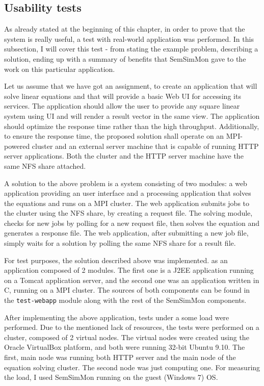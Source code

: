 \subsection{Usability tests}

As already stated at the beginning of this chapter, in order to prove that the system is really useful, a test with real-world application was performed. In this subsection, I will cover this test - from stating the example problem, describing a solution, ending up with a summary of benefits that SemSimMon gave to the work on this particular application.

Let us assume that we have got an assignment, to create an application that will solve linear equations and that will provide a basic Web UI for accessing its services. The application should allow the user to provide any square linear system using UI and will render a result vector in the same view. The application should optimize the response time rather than the high throughput. Additionally, to ensure the response time, the proposed solution shall operate on an MPI-powered cluster and an external server machine that is capable of running HTTP server applications. Both the cluster and the HTTP server machine have the same NFS share attached. 

A solution to the above problem is a system consisting of two modules: a web application providing an user interface and a processing application that solves the equations and runs on a MPI cluster. The web application submits jobs to the cluster using the NFS share, by creating a request file. The solving module, checks for new jobs by polling for a new request file, then solves the equation and generates a response file. The web application, after submitting a new job file, simply waits for a solution by polling the same NFS share for a result file. 

For test purposes, the solution described above was implemented. as an application composed of 2 modules. The first one is a J2EE application running on a Tomcat application server, and the second one was an application written in C, running on a MPI cluster. The sources of both components can be found in the \texttt{test-webapp} module along with the rest of the SemSimMon components.

After implementing the above application, tests under a some load were performed. Due to the mentioned lack of resources, the tests were performed on a cluster, composed of 2 virtual nodes. The virtual nodes were created using the Oracle VirtualBox platform, and both were running 32-bit Ubuntu 9.10. The first, main node was running both HTTP server and the main node of the equation solving cluster. The second node was just computing one. For measuring the load, I used SemSimMon running on the guest (Windows 7) OS. 

